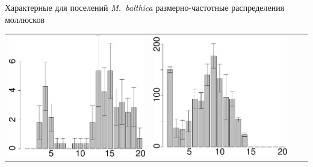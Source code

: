 \documentclass{beamer}
\begin{document}
\begin{frame}{Характерные для поселений {\it M.~balthica} размерно-частотные распределения моллюсков}
\begin{tabularx}{\linewidth}{XX|XX}
			\includegraphics[width=\linewidth]{DZ_2006_.pdf} & 
			\includegraphics[width=\linewidth]{sizestr2_2012_.pdf} & 

\end{tabularx}
\end{frame}
\end{document}
